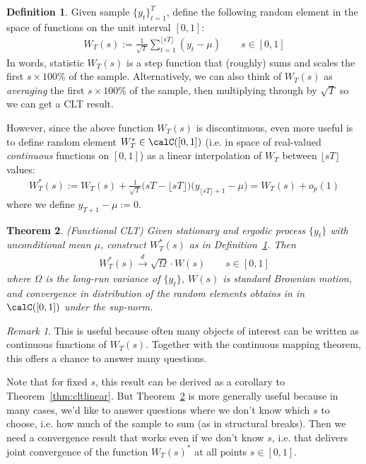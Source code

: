 \documentclass[12pt]{article}
\theoremstyle{plain}
\newtheorem{thm}{Theorem}[section]
\theoremstyle{definition}
\newtheorem{defn}[thm]{Definition}
\theoremstyle{remark}
\newtheorem*{rmk}{Remark}
\newcommand{\dto}{\xrightarrow{d}}
\newcommand{\tT}{_{t=1}^T}
\begin{document}
\clearpage
\begin{defn}
\label{fcltsum}
Given sample $\{y_t\}\tT$, define the following random element in the
space of functions on the unit interval $[0,1]$:
\begin{align*}
  W_T(s) :=
  \frac{1}{\sqrt{T}}
  \sum_{t=1}^{\lfloor s T\rfloor}
  (y_t-\mu)
  \qquad
  s\in [0,1]
\end{align*}
In words, statistic $W_T(s)$ is a step function that (roughly) sums and
scales the first $s\times 100\%$ of the sample.
Alternatively, we can also think of $W_T(s)$ as \emph{averaging} the
first $s\times 100\%$ of the sample, then multiplying through by
$\sqrt{T}$ so we can get a CLT result.

However, since the above function $W_T(s)$ is discontinuous, even more
useful is to define random element $W_T^*\in \calC([0,1])$ (i.e. in
space of real-valued \emph{continuous} functions on $[0,1]$) as a linear
interpolation of $W_T$ between $\lfloor sT\rfloor$ values:
\begin{align*}
  W_T^*(s) :=
  W_T(s)
  +
  \frac{1}{\sqrt{T}}
  \big(sT -\lfloor sT\rfloor\big)
  \big(y_{\lfloor sT\rfloor+1}-\mu\big)
  = W_T(s) + o_p(1)
\end{align*}
where we define $y_{T+1}-\mu:=0$.
\end{defn}

\begin{thm}\emph{(Functional CLT)}
\label{thm:fclt}
Given stationary and ergodic process $\{y_t\}$ with unconditional mean
$\mu$, construct $W^*_T(s)$ as in Definition~\ref{fcltsum}.
Then
\begin{align*}
  W_T^*(s)
  \dto \sqrt{\Omega}\cdot W(s)
  \qquad
  s\in [0,1]
\end{align*}
where $\Omega$ is the long-run variance of $\{y_t\}$, $W(s)$ is standard
Brownian motion, and convergence in distribution of the random elements
obtains in in $\calC([0,1])$ under the sup-norm.
\end{thm}
\begin{rmk}
This is useful because often many objects of interest can be written as
continuous functions of $W_T(s)$. Together with the continuous mapping
theorem, this offers a chance to answer many questions.

Note that for fixed $s$, this result can be derived as a corollary to
Theorem~\ref{thm:cltlinear}. But Theorem~\ref{thm:fclt} is more
generally useful because in many cases, we'd like to answer questions
where we don't know which $s$ to choose, i.e. how much of the sample to
sum (as in structural breaks). Then we need a convergence result that
works even if we don't know $s$, i.e. that delivers joint convergence of
the function $W_T(s)^*$ at all points $s\in[0,1]$.
\end{rmk}
\end{document}
